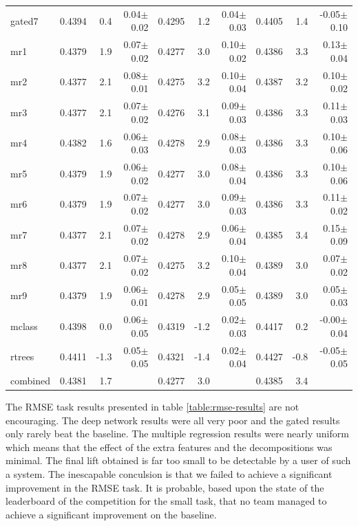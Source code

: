 \documentclass{article}
\begin{document}
\begin{table}[t]
\begin{center}
\begin{small}
\begin{sc}
\begin{tabular}{l|rr r|rr r|rr r}
gated7     & 0.4394 &   0.4 &  0.04$\pm$0.02& 0.4295 &   1.2 &  0.04$\pm$0.03& 0.4405 &   1.4 & -0.05$\pm$0.10 \\ 
\abovespace
mr1        & 0.4379 &   1.9 &  0.07$\pm$0.02& 0.4277 &   3.0 &  0.10$\pm$0.02& 0.4386 &   3.3 &  0.13$\pm$0.04 \\ 
mr2        & 0.4377 &   2.1 &  0.08$\pm$0.01& 0.4275 &   3.2 &  0.10$\pm$0.04& 0.4387 &   3.2 &  0.10$\pm$0.02 \\ 
mr3        & 0.4377 &   2.1 &  0.07$\pm$0.02& 0.4276 &   3.1 &  0.09$\pm$0.03& 0.4386 &   3.3 &  0.11$\pm$0.03 \\ 
mr4        & 0.4382 &   1.6 &  0.06$\pm$0.03& 0.4278 &   2.9 &  0.08$\pm$0.03& 0.4386 &   3.3 &  0.10$\pm$0.06 \\ 
mr5        & 0.4379 &   1.9 &  0.06$\pm$0.02& 0.4277 &   3.0 &  0.08$\pm$0.04& 0.4386 &   3.3 &  0.10$\pm$0.06 \\ 
mr6        & 0.4379 &   1.9 &  0.07$\pm$0.02& 0.4277 &   3.0 &  0.09$\pm$0.03& 0.4386 &   3.3 &  0.11$\pm$0.02 \\ 
mr7        & 0.4377 &   2.1 &  0.07$\pm$0.02& 0.4278 &   2.9 &  0.06$\pm$0.04& 0.4385 &   3.4 &  0.15$\pm$0.09 \\ 
mr8        & 0.4377 &   2.1 &  0.07$\pm$0.02& 0.4275 &   3.2 &  0.10$\pm$0.04& 0.4389 &   3.0 &  0.07$\pm$0.02 \\ 
mr9        & 0.4379 &   1.9 &  0.06$\pm$0.01& 0.4278 &   2.9 &  0.05$\pm$0.05& 0.4389 &   3.0 &  0.05$\pm$0.03 \\ 
\abovespace
mclass     & 0.4398 &   0.0 &  0.06$\pm$0.05& 0.4319 &  -1.2 &  0.02$\pm$0.03& 0.4417 &   0.2 & -0.00$\pm$0.04 \\ 
rtrees     & 0.4411 &  -1.3 &  0.05$\pm$0.05& 0.4321 &  -1.4 &  0.02$\pm$0.04& 0.4427 &  -0.8 & -0.05$\pm$0.05 \\ 
\abovespace\belowspace
combined   & 0.4381 &   1.7 &  & 0.4277 &   3.0 &  & 0.4385 &   3.4 &   \\ 
\hline
\end{tabular}
\end{sc}
\end{small}
\end{center}
\vskip -0.1in
\end{table}

The RMSE task results presented in table \ref{table:rmse-results} are not encouraging.  The deep network results were all very poor and the gated results only rarely beat the baseline.  The multiple regression results were nearly uniform which means that the effect of the extra features and the decompositions was minimal.  The final lift obtained is far too small to be detectable by a user of such a system.  The inescapable conculsion is that we failed to achieve a significant improvement in the RMSE task.  It is probable, based upon the state of the leaderboard of the competition for the small task, that no team managed to achieve a significant improvement on the baseline.
\end{document}
